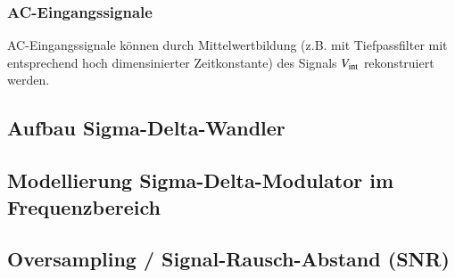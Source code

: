 \subsubsection{AC-Eingangssignale}

AC-Eingangssignale können durch Mittelwertbildung (z.B. mit Tiefpassfilter mit entsprechend hoch dimensinierter Zeitkonstante) 
des Signals $V_{\rm int}$ rekonstruiert werden.


\subsection{Aufbau Sigma-Delta-Wandler}


\subsection{Modellierung Sigma-Delta-Modulator im Frequenzbereich}


\subsection{Oversampling / Signal-Rausch-Abstand (SNR)}